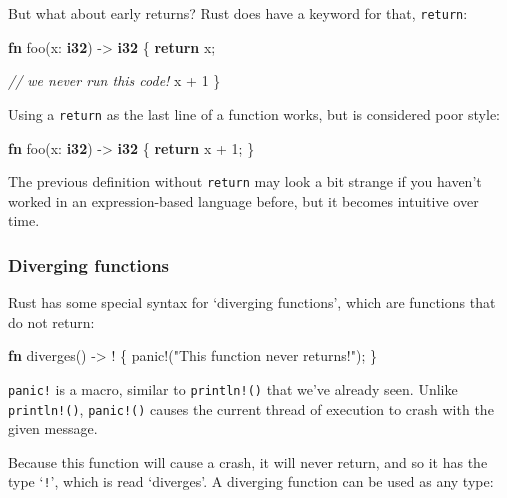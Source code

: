 \documentclass[a4paper,]{book}
\newenvironment{Shaded}{\begin{snugshade}}{\end{snugshade}}
\newcommand{\KeywordTok}[1]{\textcolor[rgb]{0.13,0.29,0.53}{\textbf{{#1}}}}
\newcommand{\DecValTok}[1]{\textcolor[rgb]{0.00,0.00,0.81}{{#1}}}
\newcommand{\StringTok}[1]{\textcolor[rgb]{0.31,0.60,0.02}{{#1}}}
\newcommand{\CommentTok}[1]{\textcolor[rgb]{0.56,0.35,0.01}{\textit{{#1}}}}
\newcommand{\OtherTok}[1]{\textcolor[rgb]{0.56,0.35,0.01}{{#1}}}
\newcommand{\NormalTok}[1]{{#1}}
\begin{document}
But what about early returns? Rust does have a keyword for that,
\texttt{return}:

\begin{Shaded}
\begin{Highlighting}[]
\KeywordTok{fn} \NormalTok{foo(x: }\KeywordTok{i32}\NormalTok{) -> }\KeywordTok{i32} \NormalTok{\{}
    \KeywordTok{return} \NormalTok{x;}

    \CommentTok{// we never run this code!}
    \NormalTok{x + }\DecValTok{1}
\NormalTok{\}}
\end{Highlighting}
\end{Shaded}

Using a \texttt{return} as the last line of a function works, but is
considered poor style:

\begin{Shaded}
\begin{Highlighting}[]
\KeywordTok{fn} \NormalTok{foo(x: }\KeywordTok{i32}\NormalTok{) -> }\KeywordTok{i32} \NormalTok{\{}
    \KeywordTok{return} \NormalTok{x + }\DecValTok{1}\NormalTok{;}
\NormalTok{\}}
\end{Highlighting}
\end{Shaded}

The previous definition without \texttt{return} may look a bit strange
if you haven't worked in an expression-based language before, but it
becomes intuitive over time.

\subsubsection{Diverging functions}\label{diverging-functions}

Rust has some special syntax for `diverging functions', which are
functions that do not return:

\begin{Shaded}
\begin{Highlighting}[]
\KeywordTok{fn} \NormalTok{diverges() -> ! \{}
    \OtherTok{panic!}\NormalTok{(}\StringTok{"This function never returns!"}\NormalTok{);}
\NormalTok{\}}
\end{Highlighting}
\end{Shaded}

\texttt{panic!} is a macro, similar to \texttt{println!()} that we've
already seen. Unlike \texttt{println!()}, \texttt{panic!()} causes the
current thread of execution to crash with the given message.

Because this function will cause a crash, it will never return, and so
it has the type `\texttt{!}', which is read `diverges'. A diverging
function can be used as any type:
\end{document}
